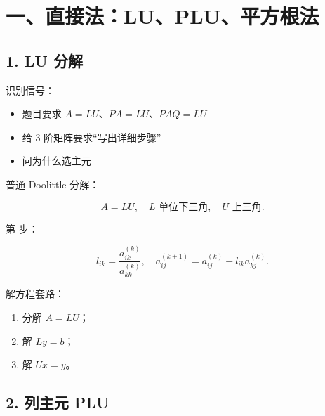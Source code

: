 \documentclass[11pt,a4paper]{ctexart}
\newcommand{\code}[1]{\begingroup\ttfamily\small #1\endgroup}
\begin{document}

\section*{一、直接法：LU、PLU、平方根法}



\subsection*{1. LU 分解}


识别信号：

\begin{itemize}

\item 题目要求 $A=LU$、$PA=LU$、$PAQ=LU$

\item 给 3 阶矩阵要求“写出详细步骤”

\item 问为什么选主元

\end{itemize}

普通 Doolittle 分解：

\[
A=LU,\quad L \text{ 单位下三角},\quad U \text{ 上三角}.
\]

第 \code{} 步：

\[
l_{ik}=\frac{a^{(k)}_{ik}}{a^{(k)}_{kk}},\quad
a^{(k+1)}_{ij}=a^{(k)}_{ij}-l_{ik}a^{(k)}_{kj}.
\]

解方程套路：

\begin{enumerate}

\item 分解 $A=LU$；

\item 解 $Ly=b$；

\item 解 $Ux=y$。

\end{enumerate}


\subsection*{2. 列主元 PLU}

\end{document}

